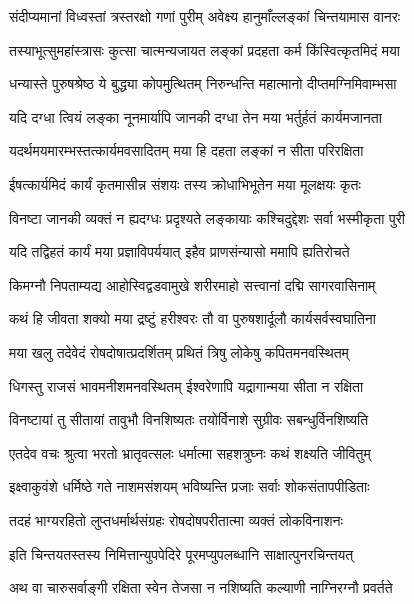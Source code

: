 \twolineshloka
{संदीप्यमानां विध्वस्तां त्रस्तरक्षो गणां पुरीम्}
{अवेक्ष्य हानुमाँल्लङ्कां चिन्तयामास वानरः} %

\twolineshloka
{तस्याभूत्सुमहांस्त्रासः कुत्सा चात्मन्यजायत}
{लङ्कां प्रदहता कर्म किंस्वित्कृतमिदं मया} %

\twolineshloka
{धन्यास्ते पुरुषश्रेष्ठ ये बुद्ध्या कोपमुत्थितम्}
{निरुन्धन्ति महात्मानो दीप्तमग्निमिवाम्भसा} %

\twolineshloka
{यदि दग्धा त्वियं लङ्का नूनमार्यापि जानकी}
{दग्धा तेन मया भर्तुर्हतं कार्यमजानता} %

\twolineshloka
{यदर्थमयमारम्भस्तत्कार्यमवसादितम्}
{मया हि दहता लङ्कां न सीता परिरक्षिता} %

\twolineshloka
{ईषत्कार्यमिदं कार्यं कृतमासीन्न संशयः}
{तस्य क्रोधाभिभूतेन मया मूलक्षयः कृतः} %

\twolineshloka
{विनष्टा जानकी व्यक्तं न ह्यदग्धः प्रदृश्यते}
{लङ्कायाः कश्चिदुद्देशः सर्वा भस्मीकृता पुरी} %

\twolineshloka
{यदि तद्विहतं कार्यं मया प्रज्ञाविपर्ययात्}
{इहैव प्राणसंन्यासो ममापि ह्यतिरोचते} %

\twolineshloka
{किमग्नौ निपताम्यद्य आहोस्विद्वडवामुखे}
{शरीरमाहो सत्त्वानां दद्मि सागरवासिनाम्} %

\twolineshloka
{कथं हि जीवता शक्यो मया द्रष्टुं हरीश्वरः}
{तौ वा पुरुषशार्दूलौ कार्यसर्वस्वघातिना} %

\twolineshloka
{मया खलु तदेवेदं रोषदोषात्प्रदर्शितम्}
{प्रथितं त्रिषु लोकेषु कपितमनवस्थितम्} %

\twolineshloka
{धिगस्तु राजसं भावमनीशमनवस्थितम्}
{ईश्वरेणापि यद्रागान्मया सीता न रक्षिता} %

\twolineshloka
{विनष्टायां तु सीतायां तावुभौ विनशिष्यतः}
{तयोर्विनाशे सुग्रीवः सबन्धुर्विनशिष्यति} %

\twolineshloka
{एतदेव वचः श्रुत्वा भरतो भ्रातृवत्सलः}
{धर्मात्मा सहशत्रुघ्नः कथं शक्ष्यति जीवितुम्} %

\twolineshloka
{इक्ष्वाकुवंशे धर्मिष्ठे गते नाशमसंशयम्}
{भविष्यन्ति प्रजाः सर्वाः शोकसंतापपीडिताः} %

\twolineshloka
{तदहं भाग्यरहितो लुप्तधर्मार्थसंग्रहः}
{रोषदोषपरीतात्मा व्यक्तं लोकविनाशनः} %

\twolineshloka
{इति चिन्तयतस्तस्य निमित्तान्युपपेदिरे}
{पूरमप्युपलब्धानि साक्षात्पुनरचिन्तयत्} %

\twolineshloka
{अथ वा चारुसर्वाङ्गी रक्षिता स्वेन तेजसा}
{न नशिष्यति कल्याणी नाग्निरग्नौ प्रवर्तते} %

